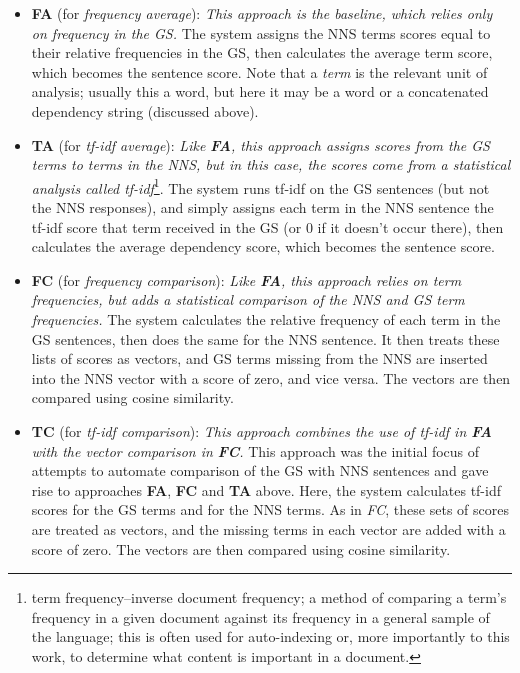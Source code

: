 \documentclass[11pt]{article}
\begin{document}
\begin{itemize}
\item{\textbf{FA} (for \textit{frequency average}): \textit{This approach is the baseline, which relies only on frequency in the GS.} The system assigns the NNS terms scores equal to their relative frequencies in the GS, then calculates the average term score, which becomes the sentence score. Note that a \textit{term} is the relevant unit of analysis; usually this a word, but here it may be a word or a concatenated dependency string (discussed above).}
\item{\textbf{TA} (for \textit{tf-idf average}): \textit{Like \textbf{FA}, this approach assigns scores from the GS terms to terms in the NNS, but in this case, the scores come from a statistical analysis called tf-idf}\footnote{term frequency--inverse document frequency; a method of comparing a term's frequency in a given document against its frequency in a general sample of the language; this is often used for auto-indexing or, more importantly to this work, to determine what content is important in a document.}. The system runs tf-idf on the GS sentences (but not the NNS responses), and simply assigns each term in the NNS sentence the tf-idf score that term received in the GS (or 0 if it doesn't occur there), then calculates the average dependency score, which becomes the sentence score.}
\item{\textbf{FC} (for \textit{frequency comparison}): \textit{Like \textbf{FA}, this approach relies on term frequencies, but adds a statistical comparison of the NNS and GS term frequencies.} The system calculates the relative frequency of each term in the GS sentences, then does the same for the NNS sentence. It then treats these lists of scores as vectors, and GS terms missing from the NNS are inserted into the NNS vector with a score of zero, and vice versa. The vectors are then compared using cosine similarity.}
\item{\textbf{TC} (for \textit{tf-idf comparison}): \textit{This approach combines the use of tf-idf in \textbf{FA} with the vector comparison in \textbf{FC}.} This approach was the initial focus of attempts to automate comparison of the GS with NNS sentences and gave rise to approaches \textbf{FA}, \textbf{FC} and \textbf{TA} above. Here, the system calculates tf-idf scores for the GS terms and for the NNS terms. As in \textit{FC}, these sets of scores are treated as vectors, and the missing terms in each vector are added with a score of zero. The vectors are then compared using cosine similarity.}
\end{itemize}
\end{document}
